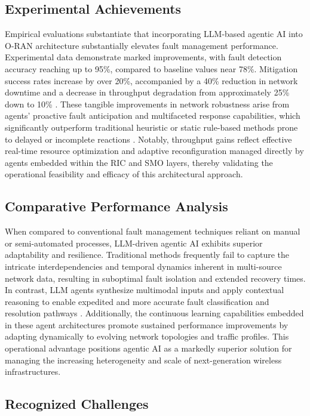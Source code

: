 \documentclass[11pt]{article}
\begin{document}
\begin{itemize}
\subsection{Experimental Achievements}

Empirical evaluations substantiate that incorporating LLM-based agentic AI into O-RAN architecture substantially elevates fault management performance. Experimental data demonstrate marked improvements, with fault detection accuracy reaching up to 95\%, compared to baseline values near 78\%. Mitigation success rates increase by over 20\%, accompanied by a 40\% reduction in network downtime and a decrease in throughput degradation from approximately 25\% down to 10\% \cite{ref46, ref55, ref27}. These tangible improvements in network robustness arise from agents' proactive fault anticipation and multifaceted response capabilities, which significantly outperform traditional heuristic or static rule-based methods prone to delayed or incomplete reactions \cite{ref27}. Notably, throughput gains reflect effective real-time resource optimization and adaptive reconfiguration managed directly by agents embedded within the RIC and SMO layers, thereby validating the operational feasibility and efficacy of this architectural approach.

\subsection{Comparative Performance Analysis}

When compared to conventional fault management techniques reliant on manual or semi-automated processes, LLM-driven agentic AI exhibits superior adaptability and resilience. Traditional methods frequently fail to capture the intricate interdependencies and temporal dynamics inherent in multi-source network data, resulting in suboptimal fault isolation and extended recovery times. In contrast, LLM agents synthesize multimodal inputs and apply contextual reasoning to enable expedited and more accurate fault classification and resolution pathways \cite{ref55}. Additionally, the continuous learning capabilities embedded in these agent architectures promote sustained performance improvements by adapting dynamically to evolving network topologies and traffic profiles. This operational advantage positions agentic AI as a markedly superior solution for managing the increasing heterogeneity and scale of next-generation wireless infrastructures.

\subsection{Recognized Challenges}


\end{itemize}
\end{document}
